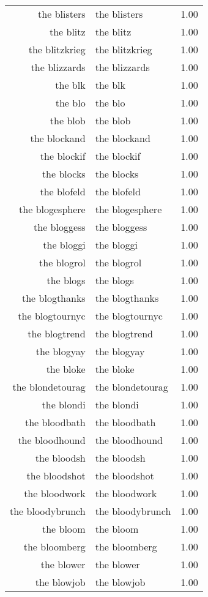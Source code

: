\begin{table}[ht]
\begin{tabular}{rlr}
  the blisters & the blisters & 1.00 \\ 
  the blitz & the blitz & 1.00 \\ 
  the blitzkrieg & the blitzkrieg & 1.00 \\ 
  the blizzards & the blizzards & 1.00 \\ 
  the blk & the blk & 1.00 \\ 
  the blo & the blo & 1.00 \\ 
  the blob & the blob & 1.00 \\ 
  the blockand & the blockand & 1.00 \\ 
  the blockif & the blockif & 1.00 \\ 
  the blocks & the blocks & 1.00 \\ 
  the blofeld & the blofeld & 1.00 \\ 
  the blogesphere & the blogesphere & 1.00 \\ 
  the bloggess & the bloggess & 1.00 \\ 
  the bloggi & the bloggi & 1.00 \\ 
  the blogrol & the blogrol & 1.00 \\ 
  the blogs & the blogs & 1.00 \\ 
  the blogthanks & the blogthanks & 1.00 \\ 
  the blogtournyc & the blogtournyc & 1.00 \\ 
  the blogtrend & the blogtrend & 1.00 \\ 
  the blogyay & the blogyay & 1.00 \\ 
  the bloke & the bloke & 1.00 \\ 
  the blondetourag & the blondetourag & 1.00 \\ 
  the blondi & the blondi & 1.00 \\ 
  the bloodbath & the bloodbath & 1.00 \\ 
  the bloodhound & the bloodhound & 1.00 \\ 
  the bloodsh & the bloodsh & 1.00 \\ 
  the bloodshot & the bloodshot & 1.00 \\ 
  the bloodwork & the bloodwork & 1.00 \\ 
  the bloodybrunch & the bloodybrunch & 1.00 \\ 
  the bloom & the bloom & 1.00 \\ 
  the bloomberg & the bloomberg & 1.00 \\ 
  the blower & the blower & 1.00 \\ 
  the blowjob & the blowjob & 1.00 \\ 

\end{tabular}
\end{table}
